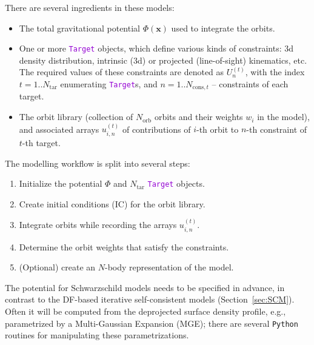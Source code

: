 \documentclass[12pt]{article}
\newcommand{\Python}{\texttt{Python}\xspace}
\newcommand{\ttt}[1]{\textcolor{darkviolet}{\texttt{#1}}}
\newcommand{\bx}{\boldsymbol{x}}
\begin{document}
There are several ingredients in these models:
\begin{itemize}  \setlength{\parskip}{2pt} \setlength{\itemsep}{2pt}
\item The total gravitational potential $\Phi(\bx)$ used to integrate the orbits.
\item One or more \ttt{Target} objects, which define various kinds of constraints: 3d density distribution, intrinsic (3d) or projected (line-of-sight) kinematics, etc. The required values of these constraints are denoted as $U_n^{(t)}$, with the index $t=1..N_\mathrm{tar}$ enumerating \ttt{Target}s, and $n=1..N_{\mathrm{cons},t}$ -- constraints of each target.
\item The orbit library (collection of $N_\mathrm{orb}$ orbits and their weights $w_i$ in the model), and associated arrays $u_{i,n}^{(t)}$ of contributions of $i$-th orbit to $n$-th constraint of $t$-th target.
\end{itemize}

The modelling workflow is split into several steps:
\begin{enumerate}  \setlength{\parskip}{2pt} \setlength{\itemsep}{2pt}
\item Initialize the potential $\Phi$ and $N_\mathrm{tar}$ \ttt{Target} objects.
\item Create initial conditions (IC) for the orbit library.
\item Integrate orbits while recording the arrays $u_{i,n}^{(t)}$.
\item Determine the orbit weights that satisfy the constraints.
\item (Optional) create an $N$-body representation of the model.
\end{enumerate}

The potential for Schwarzschild models needs to be specified in advance, in contrast to the DF-based iterative self-consistent models (Section~\ref{sec:SCM}). Often it will be computed from the deprojected surface density profile, e.g., parametrized by a Multi-Gaussian Expansion (MGE); there are several \Python routines for manipulating these parametrizations.
\end{document}
